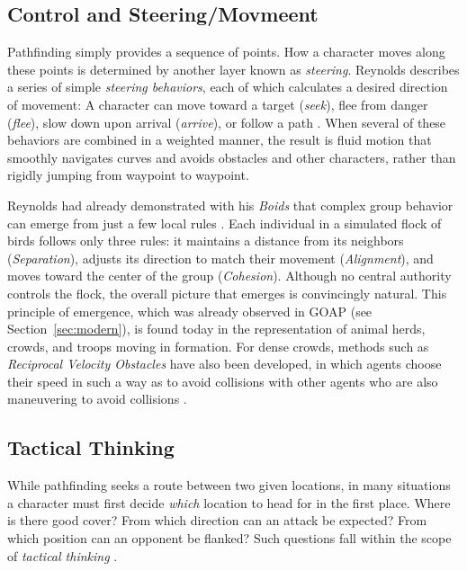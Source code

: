 \subsection{Control and Steering/Movmeent}


Pathfinding simply provides a sequence of points. How a character moves along these points is determined by another layer known as \emph{steering}. Reynolds describes a series of simple \emph{steering behaviors}, each of which calculates a desired direction of movement: A character can move toward a target (\emph{seek}), flee from danger (\emph{flee}), slow down upon arrival (\emph{arrive}), or follow a path \cite{reynolds1999}. When several of these behaviors are combined in a weighted manner, the result is fluid motion that smoothly navigates curves and avoids obstacles and other characters, rather than rigidly jumping from waypoint to waypoint.

Reynolds had already demonstrated with his \emph{Boids} that complex group behavior can emerge from just a few local rules \cite{reynolds1987}. Each individual in a simulated flock of birds follows only three rules: it maintains a distance from its neighbors (\emph{Separation}), adjusts its direction to match their movement (\emph{Alignment}), and moves toward the center of the group (\emph{Cohesion}). Although no central authority controls the flock, the overall picture that emerges is convincingly natural. This principle of emergence, which was already observed in GOAP (see Section~\ref{sec:modern}), is found today in the representation of animal herds, crowds, and troops moving in formation. For dense crowds, methods such as \emph{Reciprocal Velocity Obstacles} have also been developed, in which agents choose their speed in such a way as to avoid collisions with other agents who are also maneuvering to avoid collisions \cite{vandenberg2008}.

\subsection{Tactical Thinking}


While pathfinding seeks a route between two given locations, in many situations a character must first decide \emph{which} location to head for in the first place. Where is there good cover? From which direction can an attack be expected? From which position can an opponent be flanked? Such questions fall within the scope of \emph{tactical thinking} \cite{millington2009}.

